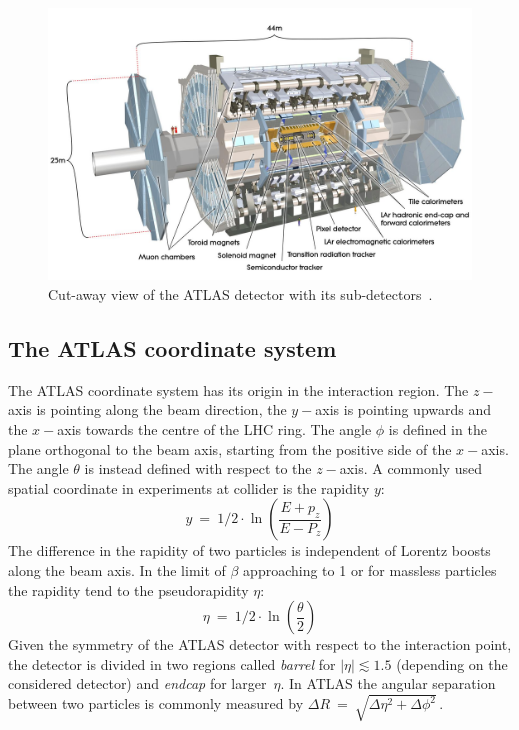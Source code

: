\begin{figure}[tp]
     \begin{center}

            \includegraphics[width=\textwidth]{figure/ATLAS.jpeg}

    \end{center}
    \caption{Cut-away view of the ATLAS detector with its sub-detectors~\cite{ATLASDetector}.}



   \label{fig:atlas}
\end{figure}


\subsection{The ATLAS coordinate system}
The ATLAS coordinate system has its origin in the interaction region. The $z-$axis is pointing along the beam direction,
the $y-$axis is pointing upwards and the $x-$axis towards the centre of the LHC ring. The angle $\phi$ is defined in the plane orthogonal
to the beam axis, starting from the positive side of the $x-$axis. The angle $\theta$ is instead defined with respect to the $z-$axis.
A commonly used spatial coordinate in  experiments at collider is the rapidity $y$:
\begin{equation}
y ~ = ~ 1/2 \cdot \ln \left( \frac{E + p_{z}}{E - P_z} \right) 
\end{equation}
The difference in the rapidity of two particles is independent of Lorentz boosts along the beam axis. In the limit of $\beta$ approaching to 1 
or for massless particles the rapidity tend to the pseudorapidity $\eta$:
\begin{equation}
\eta ~ = ~ 1/2 \cdot \ln \left( \frac{\theta}{2} \right) 
\end{equation}
Given the symmetry of the ATLAS detector with respect to the interaction point, the detector is divided in two regions called \emph{barrel} 
for $|\eta| \apprle 1.5$ (depending on the considered detector) 
and \emph{endcap} for larger~$\eta$. In ATLAS the angular separation between two particles is commonly measured by 
$\Delta R ~=~\sqrt{\Delta \eta^2 + \Delta \phi^2}\,.$ 

